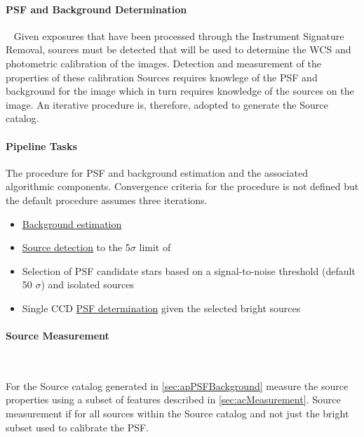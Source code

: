 \paragraph{PSF and Background Determination}~
\label{sec:apPSFBackground}
Given exposures that have been processed through the Instrument Signature Removal, sources must be detected that will be used to determine the WCS and photometric calibration of the images. Detection and measurement of the properties of these calibration Sources requires knowlege of the PSF and background for the image which in turn requires knowledge of the sources on the image. An iterative procedure is, therefore, adopted to generate the Source catalog. 

\paragraph{Pipeline Tasks}
The procedure for PSF and background estimation and the associated
algorithmic components. Convergence criteria for the procedure is not
defined but the default procedure assumes three iterations.
\begin{itemize}
\item \hyperref[sec:acBackgroundEstimation]{Background estimation}
\item \hyperref[sec:acSourceDetection]{Source detection} to the 5$\sigma$ limit of
\item Selection of PSF candidate stars based on a signal-to-noise threshold 
  (default 50 $\sigma$) and isolated sources 
\item Single CCD \hyperref[sec:acSingleCCDPSF]{PSF determination} given the selected bright sources
\end{itemize}


\paragraph{Source Measurement}~
\label{sec:apSourcemeasurement}

For the Source catalog generated in \ref{sec:apPSFBackground} measure the source properties using a subset of features described in \ref{sec:acMeasurement}. Source measurement if for all sources within the Source catalog and not just the bright subset used to calibrate the PSF. 

